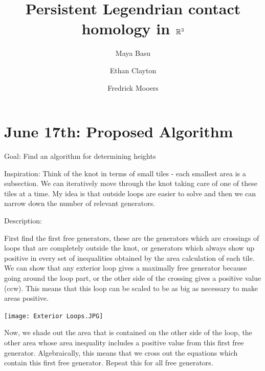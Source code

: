 \documentclass[11pt]{amsart}
\begin{document}
\author{Maya Basu}
\author{Ethan Clayton}
\author{Fredrick Mooers}

\address{University of California, Berkeley}

\address{University of Illinois, Urbana-Champaign}

\address{Virginia Tech}

\title{Persistent Legendrian contact homology in $\mathbb R^3$}




\maketitle

\tableofcontents
\newpage

\section{June 17th: Proposed Algorithm}
Goal: Find an algorithm for determining heights

Inspiration: Think of the knot in terms of small tiles - each smallest area is a subsection. We can iteratively move through the knot taking care of one of these tiles at a time. My idea is that outside loops are easier to solve and then we can narrow down the number of relevant generators.

Description:

First find the first free generators, these are the generators which are crossings of loops that are completely outside the knot, or generators which always show up positive in every set of inequalities obtained by the area calculation of each tile. We can show that any exterior loop gives a maximally free generator because going around the loop part, or the other side of the crossing gives a positive value (ccw). This means that this loop can be scaled to be as big as necessary to make areas positive.

\texttt{[image: Exterior Loops.JPG]}


Now, we shade out the area that is contained on the other side of the loop, the other area whose area inequality includes a positive value from this first free generator. Algebraically, this means that we cross out the equations which contain this first free generator. Repeat this for all free generators.
\end{document}
